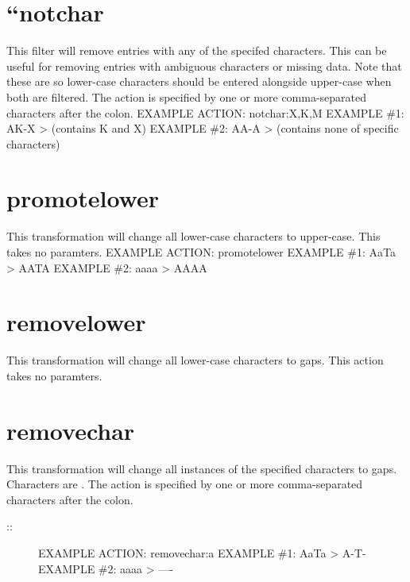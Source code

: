 \documentclass[letterpaper,11pt,english]{sphinxmanual}
\begin{document}
\section{“notchar}
\label{\detokenize{mvf_filter_modules:notchar}}
This filter will remove entries with any of the specifed characters.
This can be useful for removing entries with ambiguous characters
or missing data.  Note that these are  so lower-case
characters should be entered alongside upper-case when both are
filtered.  The action is specified by one or more comma-separated
characters after the colon.
EXAMPLE ACTION: notchar:X,K,M
EXAMPLE \#1: AK-X \textendash{}\textgreater{}  (contains K and X)
EXAMPLE \#2: AA-A \textendash{}\textgreater{}  (contains none of specific characters)


\section{promotelower}
\label{\detokenize{mvf_filter_modules:promotelower}}
This transformation will change all lower-case characters to upper-case.
This takes no paramters.
EXAMPLE ACTION: promotelower
EXAMPLE \#1: AaTa \textendash{}\textgreater{} AATA
EXAMPLE \#2: aaaa \textendash{}\textgreater{} AAAA


\section{removelower}
\label{\detokenize{mvf_filter_modules:removelower}}
This transformation will change all lower-case characters to gaps.
This action takes no paramters.

\begin{sphinxVerbatim}[commandchars=\\\{\}]
  
 
 
\end{sphinxVerbatim}


\section{removechar}
\label{\detokenize{mvf_filter_modules:removechar}}
This transformation will change all instances of the specified
characters to gaps. Characters are . The action is
specified by one or more comma-separated characters after the colon.
\begin{description}
\item[{::}] \leavevmode
EXAMPLE ACTION: removechar:a
EXAMPLE \#1: AaTa \textendash{}\textgreater{} A-T-
EXAMPLE \#2: aaaa \textendash{}\textgreater{} —-

\end{description}
\end{document}

